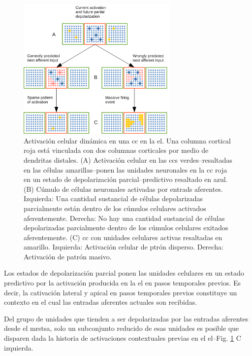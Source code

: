 {\begin{figure}[h!]
    \centering
    \includegraphics[width=0.7\textwidth]{Activation.png}
    \caption{Activación celular dinámica en una \gls{cc} en la \gls{el}.
	    Una columna cortical roja está vinculada con dos columnas corticales por medio de dendritas distales.
	    (A) Activación celular en las \glspl{cc} verdes--resaltadas en las células amarillas--ponen las unidades neuronales
	    en la \gls{cc} roja en un estado de depolarización parcial--predictivo resaltado en azul.
	    (B) Cúmulo de células neuronales activadas por entrads aferentes.
	    Izquierda: Una cantidad sustancial de células depolarizadas parcialmente están dentro de los cúmulos celulares activados aferentemente.
	    Derecha: No hay una cantidad sustancial de células depolarizadas parcialmente dentro de los cúmulos celulares exitados aferentemente.
	    (C) \gls{cc} con unidades celulares activas resaltadas en amarillo.
	    Izquierda: Activación celular de ptrón disperso.
	    Derecha: Activación de patrón masivo.}
    \label{fig:Activation}
\end{figure}

Los estados de depolarización parcial ponen las unidades celulares en un estado predictivo por
la activación producida en la \gls{el} en pasos temporales previos.
Es decir, la cativación lateral y apical en pasos temporales previos constituye un contexto en el cual
las entradas aferentes actuales son recibidas.

Del grupo de unidades que tienden a ser depolarizadas por las entradas aferentes desde el \gls{mrstsa},
solo un subconjunto reducido de esas unidades es posible que disparen dada la historia de activaciones contextuales previas
en el  \gls{el}--Fig. \ref{fig:Activation} C izquierda.

}

